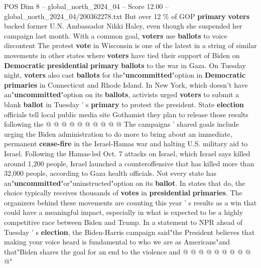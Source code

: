 \begin{textsample}{POS Dim 8 – global\_north\_2024\_04 – Score 12.00 – global\_north\_2024\_04/200362278.txt}
But over 12 \% of GOP \textbf{primary} \textbf{voters} backed former U.N.
Ambassador Nikki Haley, even though she suspended her campaign last month.
With a common goal, \textbf{voters} use \textbf{ballots} to voice discontent The protest \textbf{vote} in Wisconsin is one of the latest in a string of similar movements in other states where \textbf{voters} have tied their support of Biden on \textbf{Democratic} \textbf{presidential} \textbf{primary} \textbf{ballots} to the war in Gaza.
On Tuesday night, \textbf{voters} also cast \textbf{ballots} for the"\textbf{uncommitted}"option in \textbf{Democratic} \textbf{primaries} in Connecticut and Rhode Island.
In New York, which doesn't have an"\textbf{uncommitted}"option on its \textbf{ballots}, activists urged \textbf{voters} to submit a blank \textbf{ballot} in Tuesday ' s \textbf{primary} to protest the president.
State \textbf{election} officials tell local public media site Gothamist they plan to release those results following the @ @ @ @ @ @ @ @ @ @ The campaigns ' shared goals include urging the Biden administration to do more to bring about an immediate, permanent \textbf{cease-fire} in the Israel-Hamas war and halting U.S. military aid to Israel.
Following the Hamas-led Oct. 7 attacks on Israel, which Israel says killed around 1,200 people, Israel launched a counteroffensive that has killed more than 32,000 people, according to Gaza health officials.
Not every state has an"\textbf{uncommitted}"or"uninstructed"option on its \textbf{ballot}.
In states that do, the choice typically receives thousands of \textbf{votes} in \textbf{presidential} \textbf{primaries}.
The organizers behind these movements are counting this year ' s results as a win that could have a meaningful impact, especially in what is expected to be a highly competitive race between Biden and Trump.
In a statement to NPR ahead of Tuesday ' s \textbf{election}, the Biden-Harris campaign said"the President believes that making your voice heard is fundamental to who we are as Americans"and that"Biden shares the goal for an end to the violence and @ @ @ @ @ @ @ @ @ @"

\end{textsample}
